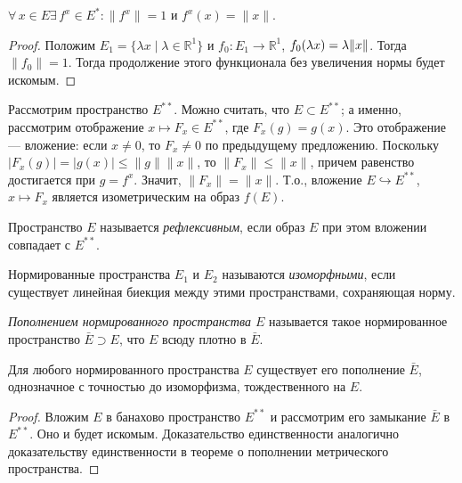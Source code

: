 \documentclass[10pt,titlepage, a4paper]{article}
\begin{document}
\begin{predl}
$\forall\,x\in E$\;\;$\exists\,f^x\in E^*:\|f^x\|=1$ и
$f^x(x)=\|x\|$.
\end{predl}

\begin{proof}
Положим $E_1=\{\lambda x\mid \lambda\in\mathbb{R}^1\}$ и $f_0\colon
E_1\to\mathbb{R}^1$, $f_0(\lambda x)\p=\lambda\|x\|$. Тогда
$\|f_0\|=1$. Тогда продолжение этого функционала без увеличения
нормы будет искомым.
\end{proof}

Рассмотрим пространство $E^{**}$. Можно считать, что $E\subset
E^{**}$; а именно, рассмотрим отображение $x\mapsto F_x\in E^{**}$,
где $F_x(g)=g(x)$. Это отображение --- вложение: если $x\neq 0$, то
$F_x\neq 0$ по предыдущему предложению. Поскольку
$|F_x(g)|=|g(x)|\leqslant \|g\|\|x\|$, то $\|F_x\|\leqslant \|x\|$,
причем равенство достигается при $g=f^x$. Значит, $\|F_x\|=\|x\|$.
Т.о., вложение $E\hookrightarrow E^{**}$, $x\mapsto F_x$ является
изометрическим на образ $f(E)$.

\begin{defen}
Пространство $E$ называется \emph{рефлексивным}, если образ $E$ при
этом вложении совпадает с $E^{**}$.
\end{defen}

\begin{defen}
Нормированные пространства $E_1$ и $E_2$ называются
\emph{изоморфными}, если существует линейная биекция между этими
пространствами, сохраняющая норму.
\end{defen}

\begin{defen}
\emph{Пополнением нормированного пространства $E$} называется такое
нормированное пространство $\bar{E}\supset E$, что $E$ всюду плотно
в $\bar{E}$.
\end{defen}

\begin{theorem}
Для любого нормированного пространства $E$ существует его пополнение
$\bar{E}$, однозначное с точностью до изоморфизма, тождественного на
$E$.
\end{theorem}

\begin{proof}
Вложим $E$ в банахово пространство $E^{**}$ и рассмотрим его
замыкание $\bar{E}$ в $E^{**}$. Оно и будет искомым. Доказательство
единственности аналогично доказательству единственности в теореме о
пополнении метрического пространства.
\end{proof}
\end{document}
